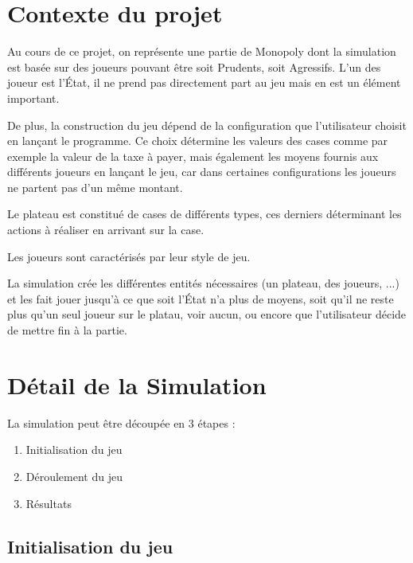 \documentclass[11pt, a4paper]{report}
\begin{document}
	
	\tableofcontents
	
	
	\chapter{Contexte du projet}
	
	Au cours de ce projet, on représente une partie de Monopoly dont la simulation est basée sur des joueurs pouvant être soit Prudents, soit Agressifs. L'un des joueur est l'État, il ne prend pas directement part au jeu mais en est un élément important.
	
	De plus, la construction du jeu dépend de la configuration que l'utilisateur choisit en lançant le programme. Ce choix détermine les valeurs des cases comme par exemple la valeur de la taxe à payer, mais également les moyens fournis aux différents joueurs en lançant le jeu, car dans certaines configurations les joueurs ne partent pas d'un même montant.
	
	Le plateau est constitué de cases de différents types, ces derniers déterminant les actions à réaliser en arrivant sur la case.
	
	Les joueurs sont caractérisés par leur style de jeu.
	
	La simulation crée les différentes entités nécessaires (un plateau, des joueurs, ...) et les fait jouer jusqu'à ce que soit l'État n'a plus de moyens, soit qu'il ne reste plus qu'un seul joueur sur le platau, voir aucun, ou encore que l'utilisateur décide de mettre fin à la partie.
	
	
	
	\chapter{Détail de la Simulation}
	
	La simulation peut être découpée en 3 étapes :
	
	\begin{enumerate}
		
		\item Initialisation du jeu
		
		\item Déroulement du jeu
		
		\item Résultats
	
	\end{enumerate}
	
	
	\section{Initialisation du jeu}
	
\end{document}
